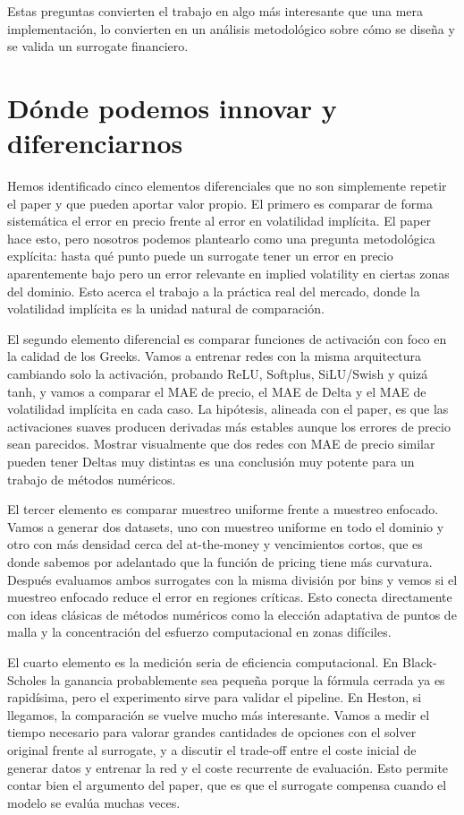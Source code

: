 \documentclass[11pt,a4paper]{article}
\begin{document}
Estas preguntas convierten el trabajo en algo más interesante que una mera implementación, lo convierten en un análisis metodológico sobre cómo se diseña y se valida un surrogate financiero.

\section*{Dónde podemos innovar y diferenciarnos}

Hemos identificado cinco elementos diferenciales que no son simplemente repetir el paper y que pueden aportar valor propio. El primero es comparar de forma sistemática el error en precio frente al error en volatilidad implícita. El paper hace esto, pero nosotros podemos plantearlo como una pregunta metodológica explícita: hasta qué punto puede un surrogate tener un error en precio aparentemente bajo pero un error relevante en implied volatility en ciertas zonas del dominio. Esto acerca el trabajo a la práctica real del mercado, donde la volatilidad implícita es la unidad natural de comparación.

El segundo elemento diferencial es comparar funciones de activación con foco en la calidad de los Greeks. Vamos a entrenar redes con la misma arquitectura cambiando solo la activación, probando ReLU, Softplus, SiLU/Swish y quizá tanh, y vamos a comparar el MAE de precio, el MAE de Delta y el MAE de volatilidad implícita en cada caso. La hipótesis, alineada con el paper, es que las activaciones suaves producen derivadas más estables aunque los errores de precio sean parecidos. Mostrar visualmente que dos redes con MAE de precio similar pueden tener Deltas muy distintas es una conclusión muy potente para un trabajo de métodos numéricos.

El tercer elemento es comparar muestreo uniforme frente a muestreo enfocado. Vamos a generar dos datasets, uno con muestreo uniforme en todo el dominio y otro con más densidad cerca del at-the-money y vencimientos cortos, que es donde sabemos por adelantado que la función de pricing tiene más curvatura. Después evaluamos ambos surrogates con la misma división por bins y vemos si el muestreo enfocado reduce el error en regiones críticas. Esto conecta directamente con ideas clásicas de métodos numéricos como la elección adaptativa de puntos de malla y la concentración del esfuerzo computacional en zonas difíciles.

El cuarto elemento es la medición seria de eficiencia computacional. En Black-Scholes la ganancia probablemente sea pequeña porque la fórmula cerrada ya es rapidísima, pero el experimento sirve para validar el pipeline. En Heston, si llegamos, la comparación se vuelve mucho más interesante. Vamos a medir el tiempo necesario para valorar grandes cantidades de opciones con el solver original frente al surrogate, y a discutir el trade-off entre el coste inicial de generar datos y entrenar la red y el coste recurrente de evaluación. Esto permite contar bien el argumento del paper, que es que el surrogate compensa cuando el modelo se evalúa muchas veces.
\end{document}
